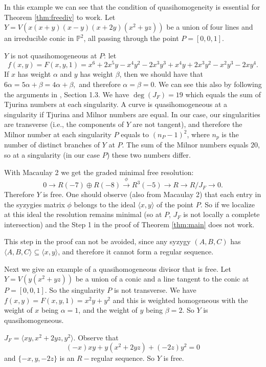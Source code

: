 \documentclass[12pt]{amsart}
\begin{document}
\begin{exm} In this example we can see that the condition of quasihomogeneity is essential for Theorem \ref{thm:freediv} to work. Let $Y=V(x(x+y)(x-y)(x+2y)(x^2+yz))$ be a union of four lines and an irreducible conic in $\mathbb P^2$, all passing through the point $P=[0,0,1]$.

$Y$ is not quasihomogeneous at $P$: let $$f(x,y)=F(x,y,1)=x^6+2x^5y-x^4y^2-2x^3y^3+x^4y+2x^3y^2-x^2y^3-2xy^4.$$ If $x$ has weight $\alpha$ and $y$ has weight $\beta$, then we should have that $6\alpha=5\alpha+\beta=4\alpha+\beta,$ and therefore $\alpha=\beta=0$. We can see this also by following the arguments in \cite{st}, Section 1.3. We have $\deg(J_F)=19$ which equals the sum of Tjurina numbers at each singularity. A curve is quasihomogeneous at a singularity if Tjurina and Milnor numbers are equal. In our case, our singularities are transverse (i.e., the components of $Y$ are not tangent), and therefore the Milnor number at each singularity $P$ equals to $(n_P-1)^2$, where $n_p$ is the number of distinct branches of $Y$ at $P$. The sum of the Milnor numbers equals $20$, so at a singularity (in our case $P$) these two numbers differ.

With Macaulay 2 we get the graded minimal free resolution: $$0\rightarrow R(-7)\oplus R(-8)\stackrel{\phi}\rightarrow R^3(-5)\rightarrow R\rightarrow R/J_F\rightarrow 0.$$ Therefore $Y$ is free. One should observe (also from Macaulay 2) that each entry in the syzygies matrix $\phi$ belongs to the ideal $\langle x,y\rangle$ of the point $P$. So if we localize at this ideal the resolution remains minimal (so at $P$, $J_F$ is not locally a complete intersection) and the Step 1 in the proof of Theorem \ref{thm:main} does not work.

This step in the proof can not be avoided, since any syzygy $(A,B,C)$ has $\langle A,B,C\rangle\subseteq\langle x,y\rangle$, and therefore it cannot form a regular sequence.
\end{exm}

\begin{exm} Next we give an example of a quasihomogeneous divisor that is free. Let $Y=V(y(x^2+yz))$ be a union of a conic and a line tangent to the conic at $P=[0,0,1]$. So the singularity $P$ is not transverse. We have $f(x,y)=F(x,y,1)=x^2y+y^2$ and this is weighted homogeneous with the weight of $x$ being $\alpha=1$, and the weight of $y$ being $\beta=2$. So $Y$ is quasihomogeneous.

$J_F=\langle xy,x^2+2yz,y^2\rangle$. Observe that $$(-x)xy+y(x^2+2yz)+(-2z)y^2=0$$ and $\{-x,y,-2z\}$ is an $R-$regular sequence. So $Y$ is free.
\end{exm}
\end{document}
